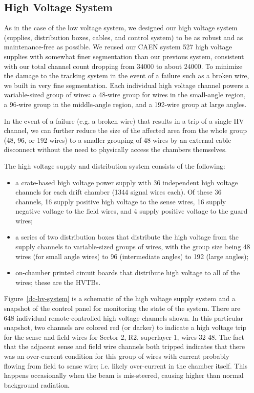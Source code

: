 \subsection{High Voltage System}

As in the case of the low voltage system, we designed our high voltage system
(supplies, distribution boxes, cables, and control system) to be as robust and 
as maintenance-free as possible.  
We reused our CAEN 
system 527 high voltage supplies with somewhat finer segmentation than our 
previous system, consistent with our total channel count dropping from 34000 
to about 24000.
To minimize the damage to the tracking system in the event of a failure such as
a broken wire, we built in very fine segmentation.
Each individual high voltage channel powers a variable-sized group of 
wires: a 48-wire group for wires in the small-angle region, a 96-wire group
in the middle-angle region, and a 192-wire group at large angles.

In the event of a failure (e.g. a broken wire) that results in a trip
of a single HV channel, we can further reduce the size of the affected
area from the whole group (48, 96, or 192 wires) to a smaller grouping
of 48 wires by an external cable disconnect without the need to 
physically access the chambers themselves.

The high voltage supply and distribution system consists of the following:
\begin{itemize}
\item a crate-based high voltage power supply with 36 independent
high voltage channels for each drift chamber (1344 signal wires each).
Of these 36 channels, 16 supply positive high voltage to the sense
wires, 16 supply negative voltage to the field wires, and 4 supply
positive voltage to the guard wires;
\item a series of two distribution boxes that distribute the high
voltage from the supply channels to variable-sized groups
of wires, with the group size being 48 wires (for small angle wires)
to 96 (intermediate angles) to 192 (large angles);
\item  on-chamber printed circuit boards that distribute high voltage
to all of the wires; these are the HVTBs.
\end{itemize}

Figure~\ref{dc-hv-system} is a schematic of the high voltage
supply system and a snapshot 
of the control panel for monitoring the state of the system.
There are 648 individual remote-controlled high voltage channels
shown.  In this particular snapshot, two channels are colored
red (or darker) to indicate a high voltage trip for the sense
and field wires for Sector 2, R2, superlayer 1, wires 32-48.
The fact that the adjacent sense and field wire channels both
tripped indicates that there was an over-current condition for
this group of wires with current probably flowing from field to
sense wire; i.e. likely over-current in the chamber itself.
This happens occasionally when the beam is mis-steered, causing
higher than normal background radiation.

